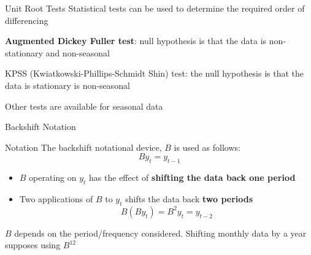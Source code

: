 \documentclass{beamer}
\newenvironment{wideenumerate}{\enumerate\addtolength{\itemsep}{10pt}}{\endenumerate}
\begin{document}
\begin{frame}{Unit Root Tests}
  Statistical tests can be used to determine the required order of differencing

  \begin{wideenumerate}
    \item \textbf{Augmented Dickey Fuller test}: null hypothesis is that the data is non-stationary and non-seasonal
    \item KPSS (Kwiatkowski-Phillips-Schmidt Shin) test: the null hypothesis is that the data is stationary is non-seasonal
    \item Other tests are available for seasonal data
  \end{wideenumerate}
  
  
\end{frame}



\begin{frame}{Backshift Notation}

  \begin{block}{Notation}
    The backshift notational device, $B$ is used as follows:\\

    \begin{equation*}
      B y_t = y_{t-1}
    \end{equation*}
  \end{block}

    
    \begin{itemize}
    \item   $B$ operating on $y_t$ has the effect of \textbf{shifting the data back one period}
    \item   Two applications of $B$ to $y_t$ shifts the data back \textbf{two periods}
      \begin{equation*}
        B(By_t) = B^2 y_t = y_{t-2}
      \end{equation*}
    \end{itemize}
    
$B$ depends on the period/frequency considered. Shifting monthly data by a year supposes using $B^{12}$

\end{frame}
\end{document}
